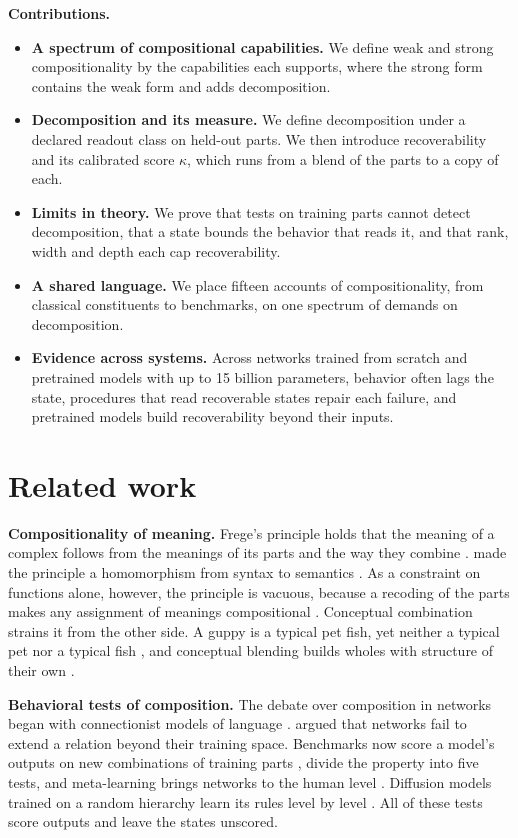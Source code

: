 \documentclass[10pt]{article}
\theoremstyle{plain}
\theoremstyle{remark}
\begin{document}
\textbf{Contributions.}
\begin{itemize}
  \item \textbf{A spectrum of compositional capabilities.} We define weak and strong compositionality by the capabilities each supports, where the strong form contains the weak form and adds decomposition.
  \item \textbf{Decomposition and its measure.} We define decomposition under a declared readout class on held-out parts. We then introduce recoverability and its calibrated score $\kappa$, which runs from a blend of the parts to a copy of each.
  \item \textbf{Limits in theory.} We prove that tests on training parts cannot detect decomposition, that a state bounds the behavior that reads it, and that rank, width and depth each cap recoverability.
  \item \textbf{A shared language.} We place fifteen accounts of compositionality, from classical constituents to benchmarks, on one spectrum of demands on decomposition.
  \item \textbf{Evidence across systems.} Across networks trained from scratch and pretrained models with up to 15 billion parameters, behavior often lags the state, procedures that read recoverable states repair each failure, and pretrained models build recoverability beyond their inputs.
\end{itemize}

\section{Related work}

\label{sec:related}

\textbf{Compositionality of meaning.} Frege's principle holds that the meaning of a complex follows from the meanings of its parts and the way they combine \citep{frege1923}. \citet{montague1970} made the principle a homomorphism from syntax to semantics \citep[see][]{janssen1997}. As a constraint on functions alone, however, the principle is vacuous, because a recoding of the parts makes any assignment of meanings compositional \citep{zadrozny1994}. Conceptual combination strains it from the other side. A guppy is a typical pet fish, yet neither a typical pet nor a typical fish \citep{osherson1981}, and conceptual blending builds wholes with structure of their own \citep{fauconnier2002}.

\textbf{Behavioral tests of composition.} The debate over composition in networks began with connectionist models of language \citep{rumelhart1986,pinker1988,elman1990}. \citet{marcus1998} argued that networks fail to extend a relation beyond their training space. Benchmarks now score a model's outputs on new combinations of training parts \citep{lake2018,keysers2020}, \citet{hupkes2020} divide the property into five tests, and meta-learning brings networks to the human level \citep{lake2023}. Diffusion models trained on a random hierarchy learn its rules level by level \citep{favero2025diffusion}. All of these tests score outputs and leave the states unscored.
\end{document}
